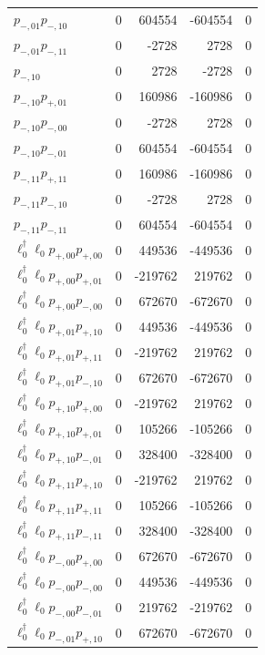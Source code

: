 \begin{longtable}{@{}lrrrr@{}}
$p_{-,01} p_{-,10}$ & 0 & 604554 & -604554 & 0 \\
$p_{-,01} p_{-,11}$ & 0 & -2728 & 2728 & 0 \\
$p_{-,10}$ & 0 & 2728 & -2728 & 0 \\
$p_{-,10} p_{+,01}$ & 0 & 160986 & -160986 & 0 \\
$p_{-,10} p_{-,00}$ & 0 & -2728 & 2728 & 0 \\
$p_{-,10} p_{-,01}$ & 0 & 604554 & -604554 & 0 \\
$p_{-,11} p_{+,11}$ & 0 & 160986 & -160986 & 0 \\
$p_{-,11} p_{-,10}$ & 0 & -2728 & 2728 & 0 \\
$p_{-,11} p_{-,11}$ & 0 & 604554 & -604554 & 0 \\
$\ell_{0}^\dagger \ell_{0} p_{+,00} p_{+,00}$ & 0 & 449536 & -449536 & 0 \\
$\ell_{0}^\dagger \ell_{0} p_{+,00} p_{+,01}$ & 0 & -219762 & 219762 & 0 \\
$\ell_{0}^\dagger \ell_{0} p_{+,00} p_{-,00}$ & 0 & 672670 & -672670 & 0 \\
$\ell_{0}^\dagger \ell_{0} p_{+,01} p_{+,10}$ & 0 & 449536 & -449536 & 0 \\
$\ell_{0}^\dagger \ell_{0} p_{+,01} p_{+,11}$ & 0 & -219762 & 219762 & 0 \\
$\ell_{0}^\dagger \ell_{0} p_{+,01} p_{-,10}$ & 0 & 672670 & -672670 & 0 \\
$\ell_{0}^\dagger \ell_{0} p_{+,10} p_{+,00}$ & 0 & -219762 & 219762 & 0 \\
$\ell_{0}^\dagger \ell_{0} p_{+,10} p_{+,01}$ & 0 & 105266 & -105266 & 0 \\
$\ell_{0}^\dagger \ell_{0} p_{+,10} p_{-,01}$ & 0 & 328400 & -328400 & 0 \\
$\ell_{0}^\dagger \ell_{0} p_{+,11} p_{+,10}$ & 0 & -219762 & 219762 & 0 \\
$\ell_{0}^\dagger \ell_{0} p_{+,11} p_{+,11}$ & 0 & 105266 & -105266 & 0 \\
$\ell_{0}^\dagger \ell_{0} p_{+,11} p_{-,11}$ & 0 & 328400 & -328400 & 0 \\
$\ell_{0}^\dagger \ell_{0} p_{-,00} p_{+,00}$ & 0 & 672670 & -672670 & 0 \\
$\ell_{0}^\dagger \ell_{0} p_{-,00} p_{-,00}$ & 0 & 449536 & -449536 & 0 \\
$\ell_{0}^\dagger \ell_{0} p_{-,00} p_{-,01}$ & 0 & 219762 & -219762 & 0 \\
$\ell_{0}^\dagger \ell_{0} p_{-,01} p_{+,10}$ & 0 & 672670 & -672670 & 0 \\

\end{longtable}
